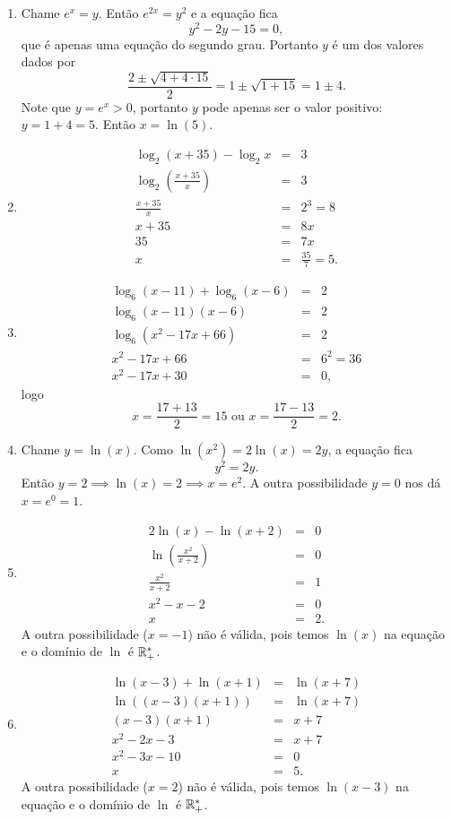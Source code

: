 \begin{enumerate}
	\item Chame $e^x=y$.
	Então $e^{2x}=y^2$ e a equação fica
	\[
		y^2-2y-15=0,
	\]
	que é apenas uma equação do segundo grau.
	Portanto $y$ é um dos valores dados por
	\[
		\frac{2\pm\sqrt{4+4\cdot15}}{2}=1\pm\sqrt{1+15}=1\pm 4.
	\]
	Note que $y=e^x>0$, portanto $y$ pode apenas ser o valor positivo: $y=1+4=5$.
	Então $x=\ln(5).$

	\item \begin{eqnarray*}
		\log_2(x+35)-\log_2x & = & 3\\
		\log_2\left(\frac{x+35}{x}\right) & = & 3\\
		\frac{x+35}{x} & = & 2^3=8\\
		x+35 & = & 8x\\
		35 & = & 7x\\
		x & = & \frac{35}{7}=5.
	\end{eqnarray*}

	\item \begin{eqnarray*}
		\log_6(x-11)+\log_6(x-6) & = & 2\\
		\log_6(x-11)(x-6) & = & 2 \\
		\log_6(x^2-17x+66) & = & 2\\
		x^2-17x+66 & = & 6^2=36 \\
		x^2-17x+30 & = & 0,
	\end{eqnarray*}
	logo
	\[
		x=\frac{17+ 13}{2}=15\mbox{ ou }x=\frac{17-13}{2}=2.
	\]

	\item Chame $y=\ln(x)$.
	Como $\ln(x^2)=2\ln(x)=2y$, a equação fica
	\[
		y^2=2y.
	\]
	Então $y=2\implies \ln(x)=2\implies x=e^2$.
	A outra possibilidade $y=0$ nos dá $x=e^0=1$.

	\item \begin{eqnarray*}
		2\ln(x)-\ln(x+2) & = & 0\\
		\ln\left(\frac{x^2}{x+2}\right) & = & 0\\
		\frac{x^2}{x+2} & = & 1\\
		x^2-x-2 & = & 0\\
		x & = & 2.
	\end{eqnarray*}
	A outra possibilidade ($x=-1$) não é válida, pois temos $\ln(x)$ na equação e o domínio de $\ln$ é $\mathbb{R}^*_+$.

	\item \begin{eqnarray*}
		\ln(x-3)+\ln(x+1) & = & \ln(x+7)\\
		\ln((x-3)(x+1)) & = & \ln(x+7) \\
		(x-3)(x+1) & = & x+7\\
		x^2-2x-3 & = & x+7\\
		x^2-3x-10 & = & 0\\
		x & = & 5.
	\end{eqnarray*}
	A outra possibilidade ($x=2$) não é válida, pois temos $\ln(x-3)$ na equação e o domínio de $\ln$ é $\mathbb{R}^*_+$.
\end{enumerate}
